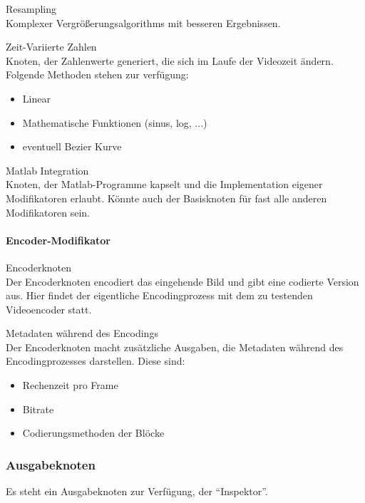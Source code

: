 \begin{speclist}[F]
\optspec Resampling \\
Komplexer Vergrößerungsalgorithms mit besseren Ergebnissen.

\optspec Zeit-Variierte Zahlen \\
Knoten, der Zahlenwerte generiert, die sich im Laufe der Videozeit ändern. Folgende Methoden stehen zur verfügung:
\begin{itemize}
	\item Linear
	\item Mathematische Funktionen (sinus, log, ...)
	\item eventuell Bezier Kurve
\end{itemize}

\optspec Matlab Integration \\
Knoten, der Matlab-Programme kapselt und die Implementation eigener Modifikatoren erlaubt. Könnte auch der Basisknoten für fast alle anderen Modifikatoren sein.

\end{speclist}

\paragraph{Encoder-Modifikator}

\begin{speclist}[F]

\spec Encoderknoten \\
Der Encoderknoten encodiert das eingehende Bild und gibt eine codierte Version aus. Hier findet der eigentliche Encodingprozess mit dem zu testenden Videoencoder statt.

\optspec Metadaten während des Encodings \\
Der Encoderknoten macht zusätzliche Ausgaben, die Metadaten während des Encodingprozesses darstellen. Diese sind:
\begin{itemize}
	\item Rechenzeit pro Frame
	\item Bitrate
	\item Codierungsmethoden der Blöcke
\end{itemize}

\end{speclist}

\subsubsection{Ausgabeknoten}
Es steht ein Ausgabeknoten zur Verfügung, der "`Inspektor"'.


